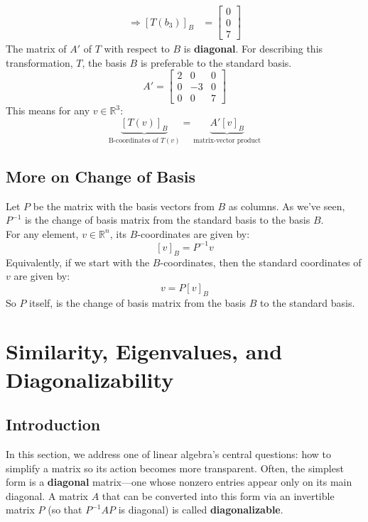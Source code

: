 \documentclass[a4paper, 9pt]{extarticle}
\begin{document}
\begin{examplebox}{}{}
$$\begin{aligned}
      \Longrightarrow [T(b_{3})]_B & = \begin{bmatrix} 0 \\ 0 \\ 7 \end{bmatrix}
    \end{aligned}
  $$
  The matrix of $A'$ of $T$ with respect to $B$ is \textbf{diagonal}. For describing this transformation, $T$, the basis $B$ is preferable to the standard basis.
  $$
    A ' =
    \begin{bmatrix}
      2 & 0  & 0 \\
      0 & -3 & 0 \\
      0 & 0  & 7
    \end{bmatrix}
  $$
  This means for any $v \in \mathbb{R}^3$:
  $$
    \underbrace{[T(v)]_B}_{\text{B-coordinates of } T(v)} = \underbrace{A'[v]_B}_{\text{matrix-vector product}}
  $$
\end{examplebox}
\subsection{More on Change of Basis}
Let $P$ be the matrix with the basis vectors from $B$ as columns. As we've seen, $P^{-1}$ is the change of basis matrix from  the standard basis to the basis $B$. \\[2ex]
For any element, $v \in \mathbb{R}^n$, its $B$-coordinates are given by:
$$
  [v]_B = P^{-1}v
$$
Equivalently, if we start with the $B$-coordinates, then the standard coordinates of $v$ are given by:
$$
  v = P[v]_B
$$
So $P$ itself, is the change of basis matrix from the basis $B$ to the standard basis.
\section{Similarity, Eigenvalues, and Diagonalizability}
\subsection*{Introduction}
\noindent In this section, we address one of linear algebra’s central questions: how to simplify a matrix so its action becomes more transparent. Often, the simplest form is a \textbf{diagonal} matrix—one whose nonzero entries appear only on its main diagonal. A matrix $A$ that can be converted into this form via an invertible matrix $P$ (so that $P^{-1}AP$ is diagonal) is called \textbf{diagonalizable}. \\[2ex]
\end{document}
